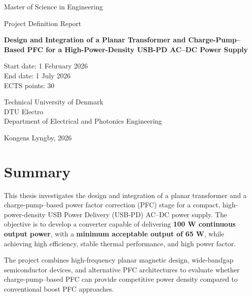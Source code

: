 \documentclass[12pt,a4paper]{report}
\begin{document}

\begin{titlepage}
\centering

{\Large Master of Science in Engineering \par}
\vspace{0.5cm}
{\Large Project Definition Report \par}

\vspace{2cm}

{\Huge\bfseries Design and Integration of a Planar Transformer and Charge-Pump--Based PFC for a High-Power-Density USB-PD AC--DC Power Supply \par}

\vspace{2cm}

Start date: 1 February 2026 \\
End date: 1 July 2026 \\
ECTS points: 30 \\

\vfill

Technical University of Denmark \\
DTU Electro \\
Department of Electrical and Photonics Engineering \\

\vspace{1cm}

Kongens Lyngby, 2026

\end{titlepage}

\chapter*{Summary}

This thesis investigates the design and integration of a planar transformer and a charge-pump--based power factor correction (PFC) stage for a compact, high-power-density USB Power Delivery (USB-PD) AC--DC power supply. The objective is to develop a converter capable of delivering \textbf{100 W continuous output power}, with a \textbf{minimum acceptable output of 65 W}, while achieving high efficiency, stable thermal performance, and high power factor.

The project combines high-frequency planar magnetic design, wide-bandgap semiconductor devices, and alternative PFC architectures to evaluate whether charge-pump--based PFC can provide competitive power density compared to conventional boost PFC approaches.
\end{document}

